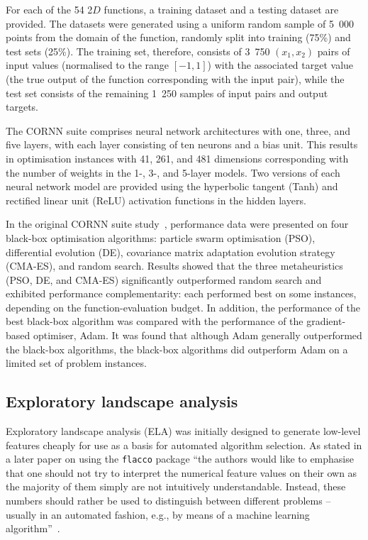 \documentclass[acmsmall,screen,review,anonymous]{acmart}
\begin{document}
For each of the 54 2$D$ functions, a training dataset and a testing dataset are provided. The datasets were generated using a uniform random sample of 5~000 points from the domain of the function, randomly split into training (75\%) and test sets (25\%). The training set, therefore, consists of 3~750 $(x_1,x_2)$ pairs of input values (normalised to the range $[-1,1]$) with the associated target value (the true output of the function corresponding with the input pair), while the test set consists of the remaining 1~250 samples of input pairs and output targets. 

The CORNN suite comprises neural network architectures with one, three, and five layers, with each layer consisting of ten neurons and a bias unit. This results in optimisation instances with 41, 261, and 481 dimensions corresponding with the number of weights in the 1-, 3-, and 5-layer models. Two versions of each neural network model are provided using the hyperbolic tangent (Tanh) and rectified linear unit (ReLU) activation functions in the hidden layers. 

In the original CORNN suite study~\cite{Malan2022}, performance data were presented on four black-box optimisation algorithms: particle swarm optimisation (PSO), differential evolution (DE), covariance matrix adaptation evolution strategy (CMA-ES), and random search. Results showed that the three metaheuristics (PSO, DE, and CMA-ES) significantly outperformed random search and exhibited performance complementarity: each performed best on some instances, depending on the function-evaluation budget. In addition, the performance of the best black-box algorithm was compared with the performance of the gradient-based optimiser, Adam. It was found that although Adam generally outperformed the black-box algorithms, the black-box algorithms did outperform Adam on a limited set of problem instances.

\subsection{Exploratory landscape analysis}
Exploratory landscape analysis (ELA) was initially designed to generate low-level features cheaply for use as a basis for automated algorithm selection. As stated in a later paper on using the \texttt{flacco} package ``the authors would like to emphasise that one should not try to interpret the numerical feature values on their own as the majority of them simply are not intuitively understandable. Instead, these numbers should rather be used to distinguish between different problems -- usually in an automated fashion, e.g., by means of a machine learning algorithm''~\cite{Kerschke2019}.
\end{document}
